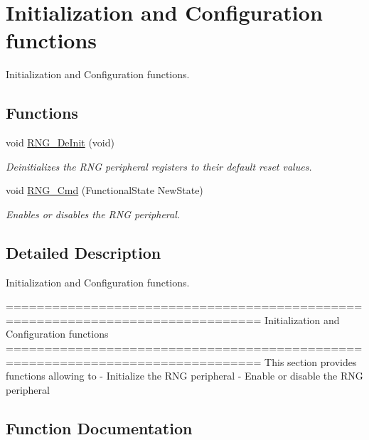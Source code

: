 \hypertarget{group___r_n_g___group1}{}\section{Initialization and Configuration functions}
\label{group___r_n_g___group1}


Initialization and Configuration functions.  


\subsection*{Functions}
\begin{DoxyCompactItemize}
\item 
void \hyperlink{group___r_n_g___group1_ga15ff5e649080076eebd51143b9ac4491}{R\+N\+G\+\_\+\+De\+Init} (void)
\begin{DoxyCompactList}\small\item\em Deinitializes the R\+N\+G peripheral registers to their default reset values. \end{DoxyCompactList}\item 
void \hyperlink{group___r_n_g___group1_ga6c1a8372da6e8a06819903c63faecd7b}{R\+N\+G\+\_\+\+Cmd} (Functional\+State New\+State)
\begin{DoxyCompactList}\small\item\em Enables or disables the R\+N\+G peripheral. \end{DoxyCompactList}\end{DoxyCompactItemize}


\subsection{Detailed Description}
Initialization and Configuration functions. 

\begin{DoxyVerb} ===============================================================================
                      Initialization and Configuration functions
 ===============================================================================  
  This section provides functions allowing to 
   - Initialize the RNG peripheral
   - Enable or disable the RNG peripheral\end{DoxyVerb}
 

\subsection{Function Documentation}
\hypertarget{group___r_n_g___group1_ga6c1a8372da6e8a06819903c63faecd7b}{}
